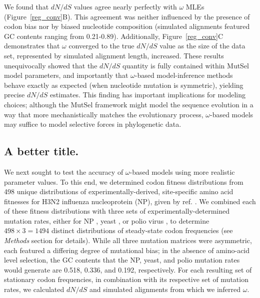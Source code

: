 \documentclass[11pt]{article}
\begin{document}
We found that $dN/dS$ values agree nearly perfectly with $\omega$ MLEs (Figure~\ref{reg_conv}B). This agreement was neither influenced by the presence of codon bias nor by biased nucleotide composition (simulated alignments featured GC contents ranging from 0.21-0.89). Additionally, Figure~\ref{reg_conv}C demonstrates that $\omega$ converged to the true $dN/dS$ value as the size of the data set, represented by simulated alignment length, increased. These results unequivocally showed that the $dN/dS$ quantity is fully contained within MutSel model parameters, and importantly that $\omega$-based model-inference methods behave exactly as expected (when nucleotide mutation is symmetric), yielding precise $dN/dS$ estimates. This finding has important implications for modeling choices; although the MutSel framework might model the sequence evolution in a way that more mechanistically matches the evolutionary process, $\omega$-based models may suffice to model selective forces in phylogenetic data.


\subsection*{A better title.}
We next sought to test the accuracy of $\omega$-based models using more realistic parameter values. To this end, we determined codon fitness distributions from 498 unique distributions of experimentally-derived, site-specific amino acid fitnesses for H3N2 influenza nucleoprotein (NP), given by ref. \cite{Bloom2014a}. We combined each of these fitness distributions with three sets of experimentally-determined mutation rates, either for NP \cite{Bloom2014a}, yeast \cite{Zhu2014}, or polio virus \cite{Acevedo2014}, to determine $498 \times 3 = 1494$ distinct distributions of steady-state codon frequencies (see \emph{Methods} section for details). While all three mutation matrices were asymmetric, each featured a differing degree of mutational bias; in the absence of amino-acid level selection, the GC contents that the NP, yeast, and polio mutation rates would generate are 0.518, 0.336, and 0.192, respectively. For each resulting set of stationary codon frequencies, in combination with its respective set of mutation rates, we calculated $dN/dS$ and simulated alignments from which we inferred $\omega$.
\end{document}
